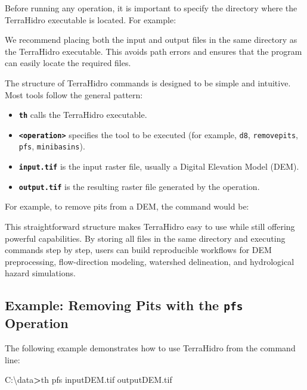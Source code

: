 \documentclass[
]{book}
\newenvironment{Shaded}{\begin{snugshade}}{\end{snugshade}}
\newcommand{\ExtensionTok}[1]{#1}
\newcommand{\NormalTok}[1]{#1}
\newcommand{\OperatorTok}[1]{\textcolor[rgb]{0.81,0.36,0.00}{\textbf{#1}}}
\providecommand{\tightlist}{%
  \setlength{\itemsep}{0pt}\setlength{\parskip}{0pt}}
\begin{document}
Before running any operation, it is important to specify the directory where the TerraHidro executable is located. For example:

We recommend placing both the input and output files in the same directory as the TerraHidro executable. This avoids path errors and ensures that the program can easily locate the required files.

The structure of TerraHidro commands is designed to be simple and intuitive. Most tools follow the general pattern:

\begin{itemize}
\tightlist
\item
  \textbf{\texttt{th}} calls the TerraHidro executable.\\
\item
  \textbf{\texttt{\textless{}operation\textgreater{}}} specifies the tool to be executed (for example, \texttt{d8}, \texttt{removepits}, \texttt{pfs}, \texttt{minibasins}).\\
\item
  \textbf{\texttt{input.tif}} is the input raster file, usually a Digital Elevation Model (DEM).\\
\item
  \textbf{\texttt{output.tif}} is the resulting raster file generated by the operation.
\end{itemize}

For example, to remove pits from a DEM, the command would be:

This straightforward structure makes TerraHidro easy to use while still offering powerful capabilities. By storing all files in the same directory and executing commands step by step, users can build reproducible workflows for DEM preprocessing, flow-direction modeling, watershed delineation, and hydrological hazard simulations.

\subsection*{\texorpdfstring{Example: Removing Pits with the \texttt{pfs} Operation}{Example: Removing Pits with the pfs Operation}}\label{example-removing-pits-with-the-pfs-operation}

The following example demonstrates how to use TerraHidro from the command line:

\begin{Shaded}
\begin{Highlighting}[]
\ExtensionTok{C:\textbackslash{}data}\OperatorTok{\textgreater{}}\NormalTok{th pfs inputDEM.tif outputDEM.tif}
\end{Highlighting}
\end{Shaded}
\end{document}
